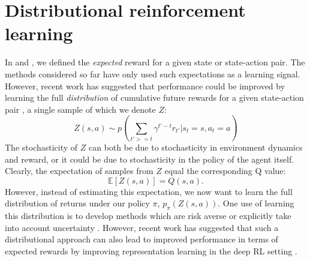\section*{Distributional reinforcement learning}
\label{sec:distributional}

In  and , we defined the \emph{expected} reward for a given state or state-action pair.
The methods considered so far have only used such expectations as a learning signal.
However, recent work has suggested that performance could be improved by learning the full \emph{distribution} of cumulative future rewards for a given state-action pair \citep{bellemare2017distributional, bellemare2023distributional,dabney2018distributional}, a single sample of which we denote $Z$:
\begin{equation}
    Z(s, a) \sim p \left ( \sum_{t' >= t} \gamma^{t' - t} r_{t'} | s_t = s, a_t = a \right )
\end{equation}
The stochasticity of $Z$ can both be due to stochasticity in environment dynamics and reward, or it could be due to stochasticity in the policy of the agent itself.
Clearly, the expectation of samples from $Z$ equal the corresponding Q value:
\begin{equation}
    \mathbb{E} \left [ Z(s, a) \right ] = Q(s, a).
\end{equation}
However, instead of estimating this expectation, we now want to learn the full distribution of returns under our policy $\pi$, $p_\pi(Z(s, a))$.
One use of learning this distribution is to develop methods which are risk averse \citep{morimura2010nonparametric,morimura2012parametric} or explicitly take into account uncertainty \citep{dearden1998bayesian}.
However, recent work has suggested that such a distributional approach can also lead to improved performance in terms of expected rewards by improving representation learning in the deep RL setting \citep{bellemare2017distributional,dabney2018distributional,rowland2019statistics,bellemare2023distributional}.

